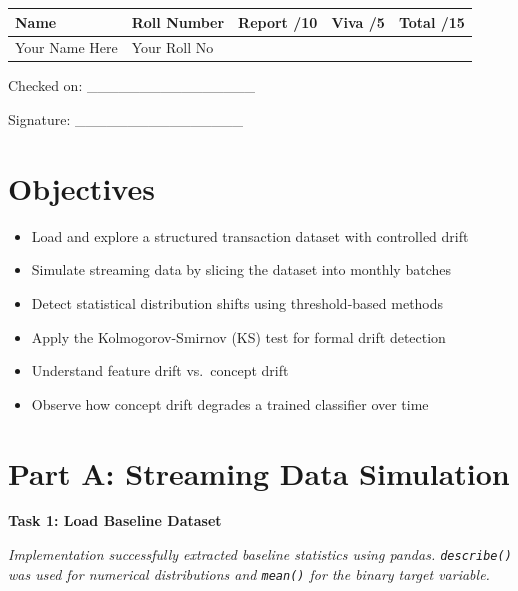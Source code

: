 \documentclass[12pt,a4paper]{article}
\begin{document}
\renewcommand{\arraystretch}{2.0}
\begin{tabularx}{\textwidth}{|Y|Y|Y|Y|Y|}
\hline
\textbf{Name} & \textbf{Roll Number} & \textbf{Report /10} & \textbf{Viva /5} & \textbf{Total /15} \\
\hline
Your Name Here & Your Roll No & & & \\
\hline
\end{tabularx}
\renewcommand{\arraystretch}{1.0}

\vspace{12pt}

\begin{flushright}
Checked on: \_\_\_\_\_\_\_\_\_\_\_\_\_\_\_\_

\vspace{6pt}
Signature: \_\_\_\_\_\_\_\_\_\_\_\_\_\_\_\_
\end{flushright}

\newpage

\section*{Objectives}
\begin{itemize}
\item Load and explore a structured transaction dataset with controlled drift
\item Simulate streaming data by slicing the dataset into monthly batches
\item Detect statistical distribution shifts using threshold-based methods
\item Apply the Kolmogorov-Smirnov (KS) test for formal drift detection
\item Understand feature drift vs.\ concept drift
\item Observe how concept drift degrades a trained classifier over time
\end{itemize}

\section*{Part A: Streaming Data Simulation}

\begin{tcolorbox}
\textbf{Task 1: Load Baseline Dataset}

\textit{Implementation successfully extracted baseline statistics using pandas. \texttt{describe()} was used for numerical distributions and \texttt{mean()} for the binary target variable.}
\end{tcolorbox}
\end{document}

